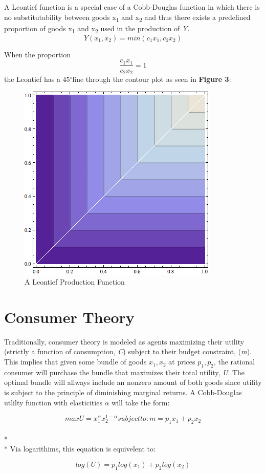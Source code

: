 \documentclass{article}
\newcommand{\degree}{\ensuremath{^\circ}}
\begin{document}
A Leontief function is a special case of a Cobb-Douglas function in which there is no substitutability between goods x\textsubscript{1} and x\textsubscript{2} and thus there exists a predefined proportion of goods x\textsubscript{1} and x\textsubscript{2} used in the production of \emph{Y}. 
$$Y(x_{1}, x_2) = min(c_{1}x_{1}, c_{2}x_{2}) $$

When the proportion 
$$\frac{c_{1}x_{1}}{c_{2}x_{2}} = 1$$
the Leontief has a 45\degree line through the contour plot as seen in {\bf Figure 3}:

\begin{figure}[!ht]
	\begin{center}
	\includegraphics[scale=0.5]{Figures/Leontief.png}
	\caption{A Leontief Production Function}
	\end{center}
\end{figure}


\section{Consumer Theory}
Traditionally, consumer theory is modeled as agents maximizing their utility (strictly a function of consumption, \emph{C}) subject to their budget constraint, (\emph{m}). This implies that given some bundle of goods $x_{1}, x_{2}$ at prices $p_{1}, p_{2}$, the rational consumer will purchase the bundle that maximizes their total utility, \emph{U}. The optimal bundle will allways include an nonzero amount of both goods since utility is subject to the principle of diminishing marginal returns. \*
A Cobb-Douglas utlilty function with elasticities $\alpha$ will take the form:

$$
max U = x_{1}^{\alpha} x_{2}^{1-\alpha}
subject to: m = p_{1}x_{1} + p_{2}x_{2}
$$
\\* \\*
Via logarithims, this equation is equivelent to:

$$
log(U) =  p_{1}log(x_{1}) + p_{2}log(x_{2}) 
$$
\end{document}
